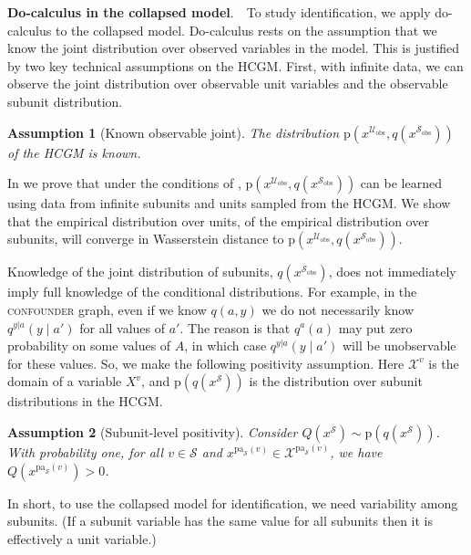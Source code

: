 \documentclass[12pt]{article}
\newtheorem{assumption}{Assumption}
\newcommand{\pa}{\mathrm{pa}}
\newcommand{\pr}{\mathrm{p}}
\newcommand{\obs}{\mathrm{obs}}
\newcommand{\parhead}[1]{\vspace{0.1in} \noindent \textbf{#1}. \,\,}
\begin{document}
\parhead{Do-calculus in the collapsed model} To study
identification, we apply do-calculus to the collapsed model.
Do-calculus rests on the assumption that we know the joint
distribution over observed variables in the model.  This is justified by two key technical assumptions on the HCGM. First,
with infinite data, we can observe the joint distribution over
observable unit variables and the observable subunit distribution.
 \begin{assumption}[Known observable joint] \label{assume:known_joint}
 	The distribution $\pr(x^{\mathcal{U}_\obs},q(x^{\mathcal{S}_\obs}))$ of the HCGM is known.
 \end{assumption}
 \noindent In  we prove that under the conditions of , 
 $\pr(x^{\mathcal{U}_\obs},q(x^{\mathcal{S}_\obs}))$ can be learned
 using data from infinite subunits and units sampled from the HCGM.
 We show that the empirical distribution over units, of the empirical
 distribution over subunits, will converge in Wasserstein distance to
 $\pr(x^{\mathcal{U}_\obs},q(x^{\mathcal{S}_\obs}))$.

Knowledge of the joint distribution of subunits, $q(x^{\mathcal{S}_\obs})$, does not immediately imply full knowledge of the conditional distributions.
For example, in the \textsc{confounder} graph, even if we know $q(a, y)$ we do not necessarily know $q^{y| a}(y\mid a')$ for all values of $a'$. The reason is that $q^a(a)$ may put zero probability on some values of $A$, in which case $q^{y| a}(y\mid a')$ will be unobservable for these values.
So, we make the following positivity assumption. Here $\mathcal{X}^v$ is the domain of a variable $X^v$, and $\pr(q(x^{\mathcal{S}}))$ is the distribution over subunit distributions in the HCGM.
\begin{assumption}[Subunit-level positivity] \label{assume:subunit_positive}
        Consider $Q(x^{\mathcal{S}}) \sim \pr(q(x^{\mathcal{S}}))$. With probability one, for all $v \in \mathcal{S}$ and $x^{\pa_\mathcal{S}(v)}\in \mathcal{X}^{\pa_\mathcal{S}(v)}$, we have $Q(x^{\pa_\mathcal{S}(v)}) > 0$.
\end{assumption}
\noindent In short, to use the collapsed model for identification, we
need variability among subunits. (If a subunit variable has the same
value for all subunits then it is effectively a unit variable.)
\end{document}
